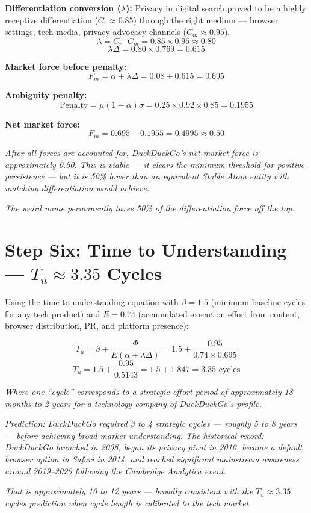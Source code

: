 \documentclass[12pt, openany]{book}
\theoremstyle{thmstyle}
\theoremstyle{defstyle}
\begin{document}
\begin{calcbox}
\textbf{Differentiation conversion ($\lambda$):}
Privacy in digital search proved to be a highly receptive differentiation ($C_r \approx 0.85$) through the right medium --- browser settings, tech media, privacy advocacy channels ($C_m \approx 0.95$).
\[
\lambda = C_r \cdot C_m = 0.85 \times 0.95 \approx 0.80
\]
\[
\lambda\Delta = 0.80 \times 0.769 = 0.615
\]

\textbf{Market force before penalty:}
\[
F_m = \alpha + \lambda\Delta = 0.08 + 0.615 = 0.695
\]

\textbf{Ambiguity penalty:}
\[
\text{Penalty} = \mu(1-\alpha)\sigma = 0.25 \times 0.92 \times 0.85 = 0.1955
\]

\textbf{Net market force:}
\[
\boxed{F_m = 0.695 - 0.1955 = 0.4995 \approx 0.50}
\]

\textit{After all forces are accounted for, DuckDuckGo's net market force is approximately 0.50. This is viable --- it clears the minimum threshold for positive persistence --- but it is 50\% lower than an equivalent Stable Atom entity with matching differentiation would achieve.}

\textit{The weird name permanently taxes 50\% of the differentiation force off the top.}
\end{calcbox}

\section{Step Six: Time to Understanding --- $T_u \approx 3.35$ Cycles}

\begin{calcbox}
Using the time-to-understanding equation with $\beta = 1.5$ (minimum baseline cycles for any tech product) and $E = 0.74$ (accumulated execution effort from content, browser distribution, PR, and platform presence):

\[
T_u = \beta + \frac{\Phi}{E(\alpha + \lambda\Delta)} = 1.5 + \frac{0.95}{0.74 \times 0.695}
\]
\[
T_u = 1.5 + \frac{0.95}{0.5143} = 1.5 + 1.847 = \mathbf{3.35} \text{ cycles}
\]

\textit{Where one ``cycle'' corresponds to a strategic effort period of approximately 18 months to 2 years for a technology company of DuckDuckGo's profile.}

\textit{Prediction: DuckDuckGo required 3 to 4 strategic cycles --- roughly 5 to 8 years --- before achieving broad market understanding. The historical record: DuckDuckGo launched in 2008, began its privacy pivot in 2010, became a default browser option in Safari in 2014, and reached significant mainstream awareness around 2019--2020 following the Cambridge Analytica event.}

\textit{That is approximately 10 to 12 years --- broadly consistent with the $T_u \approx 3.35$ cycles prediction when cycle length is calibrated to the tech market.}
\end{calcbox}
\end{document}
